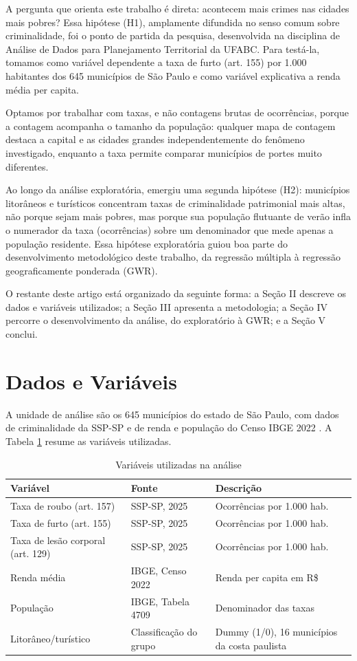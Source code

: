 \documentclass[conference]{IEEEtran}
\begin{document}
A pergunta que orienta este trabalho é direta: acontecem mais crimes nas
cidades mais pobres? Essa hipótese (H1), amplamente difundida no senso comum
sobre criminalidade, foi o ponto de partida da pesquisa, desenvolvida na
disciplina de Análise de Dados para Planejamento Territorial da UFABC. Para
testá-la, tomamos como variável dependente a taxa de furto (art. 155) por
1.000 habitantes dos 645 municípios de São Paulo e como variável explicativa
a renda média per capita.

Optamos por trabalhar com taxas, e não contagens brutas de ocorrências,
porque a contagem acompanha o tamanho da população: qualquer mapa de
contagem destaca a capital e as cidades grandes independentemente do
fenômeno investigado, enquanto a taxa permite comparar municípios de portes
muito diferentes.

Ao longo da análise exploratória, emergiu uma segunda hipótese (H2):
municípios litorâneos e turísticos concentram taxas de criminalidade
patrimonial mais altas, não porque sejam mais pobres, mas porque sua
população flutuante de verão infla o numerador da taxa (ocorrências) sobre
um denominador que mede apenas a população residente. Essa hipótese
exploratória guiou boa parte do desenvolvimento metodológico deste trabalho,
da regressão múltipla à regressão geograficamente ponderada (GWR).

O restante deste artigo está organizado da seguinte forma: a Seção II
descreve os dados e variáveis utilizados; a Seção III apresenta a
metodologia; a Seção IV percorre o desenvolvimento da análise, do
exploratório à GWR; e a Seção V conclui.

\section{Dados e Variáveis}

A unidade de análise são os 645 municípios do estado de São Paulo, com dados
de criminalidade da SSP-SP \cite{sspsp} e de renda e população do Censo IBGE
2022 \cite{ibge}. A Tabela \ref{tab:variaveis} resume as variáveis
utilizadas.

\begin{table}[htbp]
\caption{Variáveis utilizadas na análise}
\label{tab:variaveis}
\centering
\begin{tabular}{p{1.7cm}p{1.6cm}p{4.3cm}}
\hline
\textbf{Variável} & \textbf{Fonte} & \textbf{Descrição} \\
\hline
Taxa de roubo (art. 157) & SSP-SP, 2025 & Ocorrências por 1.000 hab. \\
Taxa de furto (art. 155) & SSP-SP, 2025 & Ocorrências por 1.000 hab. \\
Taxa de lesão corporal (art. 129) & SSP-SP, 2025 & Ocorrências por 1.000 hab. \\
Renda média & IBGE, Censo 2022 & Renda per capita em R\$ \\
População & IBGE, Tabela 4709 & Denominador das taxas \\
Litorâneo/turístico & Classificação do grupo & Dummy (1/0), 16 municípios da costa paulista \\
\hline
\end{tabular}
\end{table}
\end{document}
